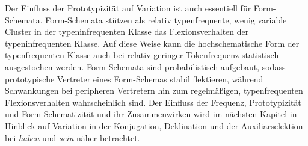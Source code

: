  
Der Einfluss der Prototypizität auf Variation ist auch essentiell für Form-Sche\-ma\-ta. Form-Schemata stützen als relativ typenfrequente, wenig variable Cluster in der typeninfrequenten  Klasse das Flexionsverhalten der typeninfrequenten Klasse. Auf diese Weise kann die hochschematische Form der typenfrequenten Klasse auch bei relativ geringer Tokenfrequenz statistisch ausgestochen werden. Form-Schemata sind probabilistisch aufgebaut, sodass prototypische Vertreter eines Form-Schemas stabil flektieren, während Schwankungen bei peripheren Vertretern hin zum regelmäßigen, typenfrequenten Flexionsverhalten wahrscheinlich sind. Der Einfluss der Frequenz, Prototypizität und Form-Schematizität und ihr Zusammenwirken wird im nächsten Kapitel in Hinblick auf Variation in der Konjugation, Deklination und der Auxiliarselektion bei \textit{haben} und \textit{sein} näher betrachtet.
